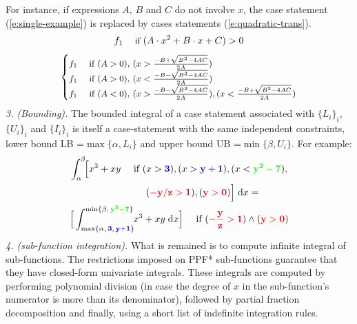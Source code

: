 \documentclass[]{article}
\newcommand{\indicator}{\mathbb{I}}%
\newcommand{\case}[2]{#2 &\text{ if } #1}%
\newcommand{\singlecase}[2]{#2 \quad \text{ if } #1}
\newcommand{\dd}{\;\mathrm{d}} %
\begin{document}
\begin{enumerate}[leftmargin=2.6ex]
For instance, if expressions {\footnotesize$A$}, {\footnotesize$B$} and {\footnotesize$C$} do not involve $x$,
the case statement (\ref{e:single-example})
is replaced by cases statements (\ref{e:quadratic-trans}).
\begin{equation}\footnotesize
\label{e:single-example}
\singlecase{(A \cdot x^2 + B \cdot x + C)>0}{f_1}
\end{equation}
\begin{align}\footnotesize
\label{e:quadratic-trans}
\begin{cases}
  \case{(A>0), \, (x> \frac{-B + \sqrt{B^2 - 4 A C}}{2 A}) }{f_1} \\ 
  \case{(A>0), \, (x< \frac{-B - \sqrt{B^2 - 4 A C}}{2 A}) }{f_1} \\ 
  \case{(A<0), \, (x> \frac{-B - \sqrt{B^2 - 4 A C}}{2 A}),
                              (x< \frac{-B + \sqrt{B^2 - 4 A C}}{2 A})}{f_1}
 \end{cases}
\end{align}
\emph{3. (Bounding).} The bounded integral of a case statement 
associated with $\{L_i\}_i$, $\{U_i\}_i$ and $\{I_i\}_i$ 
is itself a case-statement with the same independent constraints,
 lower bound LB =$\max\{\alpha, L_i\}$ and 
 upper bound UB =$ \min\{\beta, U_i\}$.
For example:
\begin{align*}\footnotesize 
&\int_{\alpha}^{\beta}\!\! \Big[
\singlecase{(x>{\bf\color{blue}3}), (x>{\bf\color{blue}y+1}), (x<{\bf\color{green}y^2-7}), \\ 
&\hspace{28mm} ({\bf\color{red}-y/z > 1}) , ({\bf\color{red}y>0})}
{x^3 + xy} \Big] \dd x = \\
&\singlecase{({\bf\color{red}-\frac{y}{z} > 1}) \wedge ({\bf\color{red}y>0})}
{\Big[ \int_{\max\{\alpha, \,{\bf {\color{blue}3}, \, {\color{blue}y+1}}\}}^{\min\{\beta, \, {\bf\color{green} y^2 - 7}\}} \!\! x^3 + xy \dd x \Big]} 
\end{align*}  
\emph{4. (sub-function integration).} %
What is remained is to compute infinite integral of sub-functions. 
The restrictions imposed on PPF* sub-functions 
guarantee that they have closed-form %
univariate integrals.
These integrals are computed by performing polynomial division 
(in case the degree of $x$ in the sub-function's numerator is more than its denominator),
followed by partial fraction decomposition and finally, using a short list of indefinite integration rules.



\end{enumerate}
\end{document}

